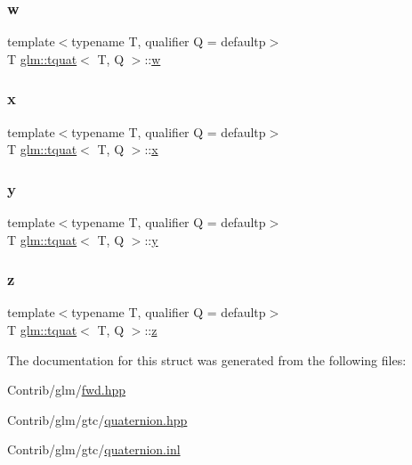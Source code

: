 \subsubsection{\texorpdfstring{w}{w}}
{\footnotesize\ttfamily template$<$typename T, qualifier Q = defaultp$>$ \\
T \mbox{\hyperlink{structglm_1_1tquat}{glm\+::tquat}}$<$ T, Q $>$\+::\mbox{\hyperlink{_s_d_l__opengl__glext_8h_a6ee8f168a7ab6785a9bb57c6715dad99}{w}}}

\mbox{\label{structglm_1_1tquat_a74fac4f3deda35413106feeae734641c}} 
\subsubsection{\texorpdfstring{x}{x}}
{\footnotesize\ttfamily template$<$typename T, qualifier Q = defaultp$>$ \\
T \mbox{\hyperlink{structglm_1_1tquat}{glm\+::tquat}}$<$ T, Q $>$\+::\mbox{\hyperlink{_s_d_l__opengl_8h_ad0e63d0edcdbd3d79554076bf309fd47}{x}}}

\mbox{\label{structglm_1_1tquat_a09c876d49b2406fd50aca892f3637f0f}} 
\subsubsection{\texorpdfstring{y}{y}}
{\footnotesize\ttfamily template$<$typename T, qualifier Q = defaultp$>$ \\
T \mbox{\hyperlink{structglm_1_1tquat}{glm\+::tquat}}$<$ T, Q $>$\+::\mbox{\hyperlink{_s_d_l__opengl_8h_a1675d9d7bb68e1657ff028643b4037e3}{y}}}

\mbox{\label{structglm_1_1tquat_a81cfe33795e56627715972ad533605d4}} 
\subsubsection{\texorpdfstring{z}{z}}
{\footnotesize\ttfamily template$<$typename T, qualifier Q = defaultp$>$ \\
T \mbox{\hyperlink{structglm_1_1tquat}{glm\+::tquat}}$<$ T, Q $>$\+::\mbox{\hyperlink{_s_d_l__opengl__glext_8h_a5e74030ebb3297ce1b37ff716fedd68f}{z}}}



The documentation for this struct was generated from the following files\+:\begin{DoxyCompactItemize}
\item 
Contrib/glm/\mbox{\hyperlink{fwd_8hpp}{fwd.\+hpp}}\item 
Contrib/glm/gtc/\mbox{\hyperlink{gtc_2quaternion_8hpp}{quaternion.\+hpp}}\item 
Contrib/glm/gtc/\mbox{\hyperlink{gtc_2quaternion_8inl}{quaternion.\+inl}}\end{DoxyCompactItemize}
